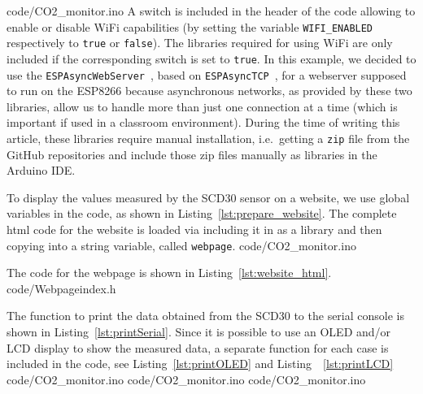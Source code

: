 \documentclass[12pt,a4paper]{article}
\begin{document}
%
{code/CO2_monitor.ino} 
A switch is included in the header of the code allowing to enable or disable WiFi capabilities (by setting the variable \texttt{WIFI\_ENABLED} respectively to \texttt{true} or \texttt{false}). The libraries required for using WiFi are only included if the corresponding switch is set to \texttt{true}. In this example, we decided to use the \texttt{ESPAsyncWebServer}~\cite{MENODEV2020B}, based on \texttt{ESPAsyncTCP}~\cite{MENODEV2020A}, for a webserver supposed to run on the ESP8266 because asynchronous networks, as provided by these two libraries, allow us to handle more than just one connection at a time (which is important if used in a classroom environment). During the time of writing this article, these libraries require manual installation, i.e.\ getting a \texttt{zip} file from the GitHub repositories and include those zip files manually as libraries in the Arduino IDE.

To display the values measured by the SCD30 sensor on a website, we use global variables in the code, as shown in Listing~\ref{lst:prepare_website}. The complete html code for the website is loaded via including it in as a library and then copying into a string variable, called \texttt{webpage}.
%
{code/CO2_monitor.ino}

The code for the webpage is shown in Listing~\ref{lst:website_html}.
%
{code/Webpageindex.h}

The function to print the data obtained from the SCD30 to the serial console is shown in Listing~\ref{lst:printSerial}. Since it is possible to use an OLED and/or LCD display to show the measured data, a separate function for each case is included in the code, see Listing~\ref{lst:printOLED} and Listing~~\ref{lst:printLCD}
%
{code/CO2_monitor.ino} 
%
{code/CO2_monitor.ino} 
%
{code/CO2_monitor.ino} 
\end{document}
